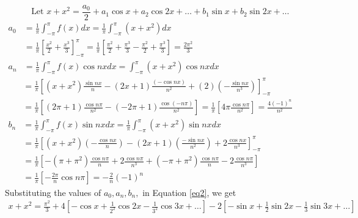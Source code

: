 \begin{answer}
	\begin{equation}
\label{eq2}
	\text { Let } x+x^{2}=\frac{a_{0}}{2}+a_{1} \cos x+a_{2} \cos 2 x+\ldots+b_{1} \sin x+b_{2} \sin 2 x+\ldots
	\end{equation}
	$\begin{aligned} a_{0} &=\frac{1}{\pi} \int_{-\pi}^{\pi} f(x) d x=\frac{1}{\pi} \int_{-\pi}^{\pi}\left(x+x^{2}\right) d x \\ &=\frac{1}{\pi}\left[\frac{x^{2}}{2}+\frac{x^{3}}{3}\right]_{-\pi}^{\pi}=\frac{1}{\pi}\left[\frac{\pi^{2}}{2}+\frac{\pi^{3}}{3}-\frac{\pi^{2}}{2}+\frac{\pi^{3}}{3}\right]=\frac{2 \pi^{2}}{3} \\ a_{n} &=\frac{1}{\pi} \int_{-\pi}^{\pi} f(x) \cos n x d x=\int_{-\pi}^{\pi}\left(x+x^{2}\right) \cos n x d x \end{aligned}$\\
	$\begin{aligned} &=\frac{1}{\pi}\left[\left(x+x^{2}\right) \frac{\sin n x}{n}-(2 x+1) \frac{(-\cos n x)}{n^{2}}+(2)\left(-\frac{\sin n x}{n^{3}}\right)\right]_{-\pi}^{\pi} \\ &=\frac{1}{\pi}\left[(2 \pi+1) \frac{\cos n \pi}{n^{2}}-(-2 \pi+1) \frac{\cos (-n \pi)}{n^{2}}\right]=\frac{1}{\pi}\left[4 \pi \frac{\cos n \pi}{n^{2}}\right]=\frac{4(-1)^{n}}{n^{2}} \\ b_{n} &=\frac{1}{\pi} \int_{-\pi}^{\pi} f(x) \sin n x d x=\frac{1}{\pi} \int_{-\pi}^{\pi}\left(x+x^{2}\right) \sin n x d x \\ &=\frac{1}{\pi}\left[\left(x+x^{2}\right)\left(-\frac{\cos n x}{n}\right)-(2 x+1)\left(\frac{-\sin n x}{n^{2}}\right)+2 \frac{\cos n x}{n^{3}}\right]_{-\pi}^{\pi} \\ &=\frac{1}{\pi}\left[-\left(\pi+\pi^{2}\right) \frac{\cos n \pi}{n}+2 \frac{\cos n \pi}{n^{3}}+\left(-\pi+\pi^{2}\right) \frac{\cos n \pi}{n}-2 \frac{\cos n \pi}{n^{3}}\right] \\ &=\frac{1}{\pi}\left[-\frac{2 \pi}{n} \cos n \pi\right]=-\frac{2}{n}(-1)^{n} \end{aligned}$\\
	Substituting the values of $a_{0}, a_{n}, b_{n},$ in Equation \ref{eq2}, we get
	\begin{equation}
	\begin{array}{r}
	x+x^{2}=\frac{\pi^{2}}{3}+4\left[-\cos x+\frac{1}{2^{2}} \cos 2 x-\frac{1}{3^{2}} \cos 3 x+\ldots\right] 
	-2\left[-\sin x+\frac{1}{2} \sin 2 x-\frac{1}{3} \sin 3 x+\ldots\right]
	\end{array}
	\end{equation}
\end{answer}
